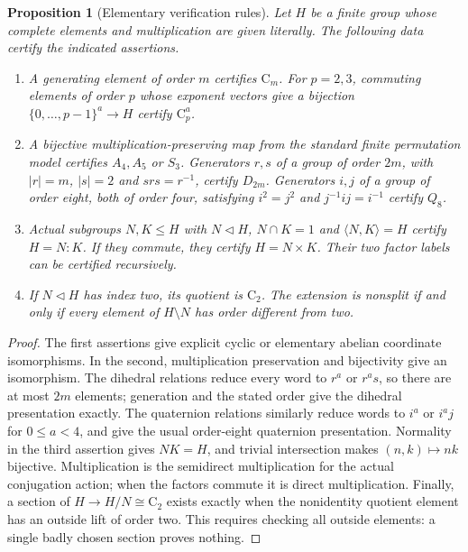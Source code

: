 \documentclass[10pt]{article}
\newtheorem{proposition}{Proposition}
\newcommand{\C}{\mathrm C}
\begin{document}
\begin{proposition}[Elementary verification rules]
Let $H$ be a finite group whose complete elements and multiplication are
given literally. The following data certify the indicated assertions.
\begin{enumerate}
\item A generating element of order $m$ certifies $\C_m$. For $p=2,3$,
commuting elements of order $p$ whose exponent vectors give a bijection
$\{0,\ldots,p-1\}^a\to H$ certify $\C_p^a$.
\item A bijective multiplication-preserving map from the standard finite
permutation model certifies $A_4,A_5$ or $S_3$. Generators $r,s$ of a group
of order $2m$, with $|r|=m$, $|s|=2$ and $srs=r^{-1}$, certify $D_{2m}$.
Generators $i,j$ of a group of order eight, both of order four, satisfying
$i^2=j^2$ and $j^{-1}ij=i^{-1}$ certify $Q_8$.
\item Actual subgroups $N,K\le H$ with $N\lhd H$, $N\cap K=1$ and
$\langle N,K\rangle=H$ certify $H=N:K$. If they commute, they certify
$H=N\times K$. Their two factor labels can be certified recursively.
\item If $N\lhd H$ has index two, its quotient is $\C_2$. The extension
is nonsplit if and only if every element of $H\setminus N$ has order
different from two.
\end{enumerate}
\end{proposition}
\begin{proof}
The first assertions give explicit cyclic or elementary abelian coordinate
isomorphisms. In the second, multiplication preservation and bijectivity
give an isomorphism. The dihedral relations reduce every word to $r^a$ or
$r^as$, so there are at most $2m$ elements; generation and the stated order
give the dihedral presentation exactly. The quaternion relations similarly
reduce words to $i^a$ or $i^aj$ for $0\le a<4$, and give the usual order-eight
quaternion presentation. Normality in the third assertion gives $NK=H$,
and trivial intersection makes $(n,k)\mapsto nk$ bijective. Multiplication
is the semidirect multiplication for the actual conjugation action; when
the factors commute it is direct multiplication. Finally, a section of
$H\to H/N\cong\C_2$ exists exactly when the nonidentity quotient element
has an outside lift of order two. This requires checking all outside
elements: a single badly chosen section proves nothing.
\end{proof}
\end{document}
